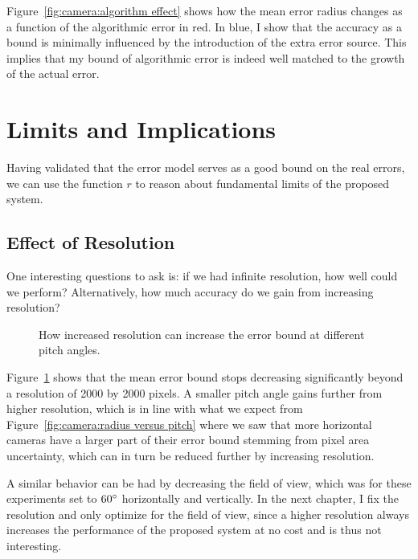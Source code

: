 \documentclass[a4paper,12pt,twoside,openright]{report}
\begin{document}
Figure~\ref{fig:camera:algorithm effect} shows how the mean error radius changes as a function of the 
algorithmic error in red. In blue, I show that the accuracy as a bound is minimally influenced 
by the introduction of the extra error source. This implies that my bound of
algorithmic error is indeed well matched to the growth of the actual error.


\section{Limits and Implications}
\label{sec:camera:implications}

Having validated that the error model serves as a good bound on the real errors, we can use the function $r$
to reason about fundamental limits of the proposed system.

\subsection{Effect of Resolution}

One interesting questions to ask is: if we had infinite resolution,
how well could we perform? Alternatively, how much accuracy do we gain from increasing resolution?

\begin{figure}[htb]
    \begin{center}
        
    \end{center}
    \caption[Resolution Limits]{How increased resolution can increase the error bound at different pitch angles.}
    \label{fig:camera:resolution}
\end{figure}

Figure~\ref{fig:camera:resolution} shows that the mean error bound stops decreasing
significantly beyond a resolution of 2000 by 2000 pixels. A smaller pitch 
angle gains further from higher resolution, which is in line with what we 
expect from Figure~\ref{fig:camera:radius versus pitch} where we saw that more horizontal cameras
have a larger part of their error bound stemming from pixel area uncertainty,
which can in turn be reduced further by increasing resolution.

A similar behavior can be had by decreasing the field of view, which was for
these experiments set to $60\degree$ horizontally and vertically. 
In the next chapter, I fix the resolution and only optimize for the field of view,
since a higher resolution always increases the performance
of the proposed system at no cost and is thus not interesting.
\end{document}
